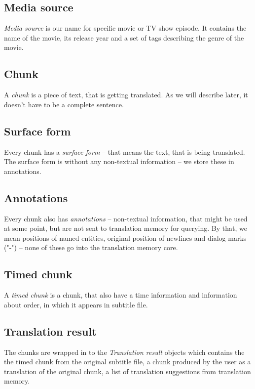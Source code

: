 \subsection*{Media source}
\emph{Media source} is our name for specific movie or TV show episode. It contains the name of the movie, its release year and a set of tags describing the genre of the movie.

\subsection*{Chunk}
A \emph{chunk} is a piece of text, that is getting translated. As we will describe later, it doesn't have to be a complete sentence.

\subsection*{Surface form}
Every chunk has a \emph{surface form} -- that means the text, that is being translated. The surface form is without any non-textual information -- we store these in annotations.

\subsection*{Annotations}
Every chunk also has \emph{annotations} -- non-textual information, that might be used at some point, but are not sent to translation memory for querying. By that, we mean positions of named entities, original position of newlines and dialog marks ("-") -- none of these go into the translation memory core.

\subsection*{Timed chunk}
A \emph{timed chunk} is a chunk, that also have a time information and information about order, in which it appears in subtitle file.

\subsection*{Translation result}
The chunks are wrapped in to the \emph{Translation result} objects which contains the the timed chunk from the original subtitle file, a chunk produced by the user as a translation of the original chunk, a list of translation suggestions from translation memory.


